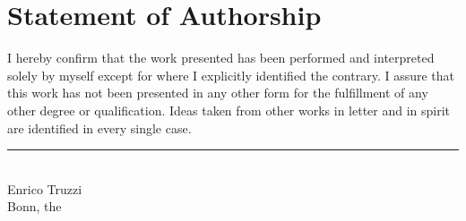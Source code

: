 \documentclass[a4paper,12pt]{article} %
\numberwithin{equation}{section} %
\numberwithin{figure}{section}
\numberwithin{table}{section}
\begin{document}
\newpage
\thispagestyle{plain}
\section*{Statement of Authorship} %
I hereby confirm that the work presented has been performed and interpreted solely by myself except for where I explicitly identified the contrary. I assure that this work has not been presented in any other form for the fulfillment of any other degree or qualification. Ideas taken from other works in letter and in spirit are identified in every single case.

\vspace{2cm}
\noindent
\rule{8cm}{0.4pt}\\
Enrico Truzzi\\
Bonn, the 
\end{document}
